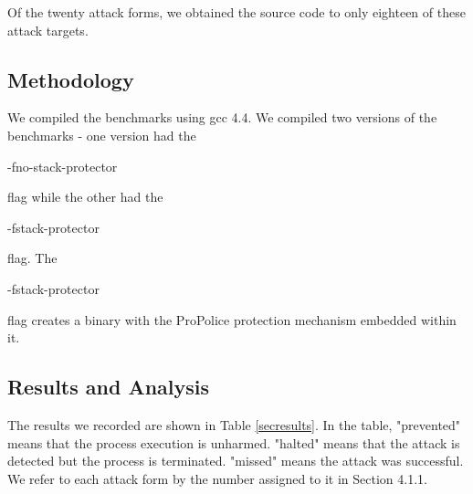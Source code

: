 Of the twenty attack forms, we obtained the source code to only eighteen of these attack targets.

\subsection{Methodology}

We compiled the benchmarks using gcc 4.4. We compiled two versions of the benchmarks - one version
had the \begin{em}-fno-stack-protector\end{em} flag while the other had the
\begin{em}-fstack-protector\end{em} flag. The \begin{em}-fstack-protector\end{em} flag creates a
binary with the ProPolice protection mechanism embedded within it.

\subsection{Results and Analysis}

The results we recorded are shown in Table \ref{secresults}. In the table, "prevented" means that
the process execution is unharmed. "halted" means that the attack is detected but the process is
terminated. "missed" means the attack was successful. We refer to each attack form by the number
assigned to it in Section 4.1.1.

